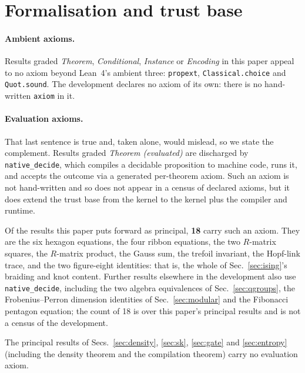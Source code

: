 \documentclass[aps,prx,nofootinbib,superscriptaddress,12pt]{revtex4-2}
\begin{document}
\section*{Formalisation and trust base}
\label{sec:trust}

\paragraph{Ambient axioms.}
Results graded \emph{Theorem}, \emph{Conditional}, \emph{Instance} or
\emph{Encoding} in this paper appeal to no axiom beyond Lean~4's
ambient three: \texttt{propext}, \texttt{Classical.choice} and
\texttt{Quot.sound}. The development declares no axiom of its own: there
is no hand-written \texttt{axiom} in it.

\paragraph{Evaluation axioms.}
That last sentence is true and, taken alone, would mislead, so we state
the complement. Results graded \emph{Theorem (evaluated)} are discharged
by \texttt{native\_decide}, which compiles a decidable proposition to
machine code, runs it, and accepts the outcome via a generated
per-theorem axiom. Such an axiom is not hand-written and so does not
appear in a census of declared axioms, but it does extend the trust base
from the kernel to the kernel plus the compiler and runtime.

Of the results this paper puts forward as principal, \textbf{18} carry
such an axiom. They are the six hexagon equations, the four ribbon
equations, the two $R$-matrix squares, the $R$-matrix product, the Gauss
sum, the trefoil invariant, the Hopf-link trace, and the two
figure-eight identities: that is, the whole of
Sec.~\ref{sec:ising}'s braiding and knot content. Further results
elsewhere in the development also use \texttt{native\_decide}, including
the two algebra equivalences of Sec.~\ref{sec:qgroups}, the
Frobenius--Perron dimension identities of Sec.~\ref{sec:modular} and the
Fibonacci pentagon equation; the count of 18 is over this paper's
principal results and is not a census of the development.

The principal results of Secs.~\ref{sec:density}, \ref{sec:sk},
\ref{sec:gate} and \ref{sec:entropy} (including the density theorem
and the compilation theorem) carry no evaluation axiom.
\end{document}
